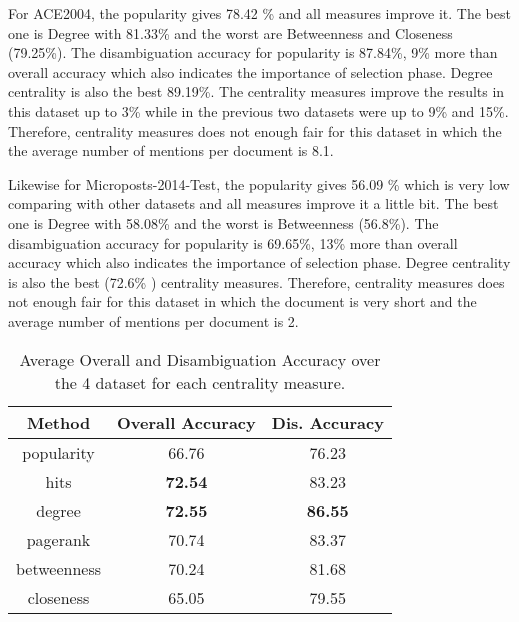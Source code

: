 \documentclass{llncs}
\begin{document}
 For ACE2004, the popularity gives 78.42 \% and all measures improve it. The best one is Degree with 81.33\% and the worst are  Betweenness and Closeness (79.25\%). The disambiguation accuracy for popularity is 87.84\%, 9\% more than overall accuracy which also indicates the importance of selection phase. Degree centrality is also the best 89.19\%. The centrality measures improve the results in this dataset up to 3\% while in the previous two datasets were up to 9\% and 15\%. Therefore, centrality measures does not enough fair for this dataset in which the the average number of mentions per document is 8.1.

Likewise for Microposts-2014-Test, the popularity gives 56.09 \% which is very low comparing with other datasets and all measures improve it a little bit. The best one is Degree with 58.08\% and the worst is  Betweenness  (56.8\%). The disambiguation accuracy for popularity is 69.65\%, 13\% more than overall accuracy which also indicates the importance of selection phase. Degree centrality is also the best (72.6\% )  centrality measures. Therefore, centrality measures does not enough fair for this dataset in which the document is very short and  the average number of mentions per document is 2.

\begin{table}[!h]
\centering
\begin{tabular}{|c|c|c|}
    \hline 
Method&  Overall Accuracy&  Dis. Accuracy\\
   \hline 
     popularity&66.76 &76.23  \\
      hits&  \textbf{72.54} & 83.23  \\
      degree &\textbf{72.55}&  \textbf{86.55}  \\
      pagerank&   70.74 &83.37 \\
      betweenness &  70.24 &81.68\\
      closeness&65.05& 79.55\\
     \hline  
\end{tabular}
\caption{Average Overall  and Disambiguation Accuracy over the 4 dataset for each centrality measure. }
\end{table}
\end{document}
